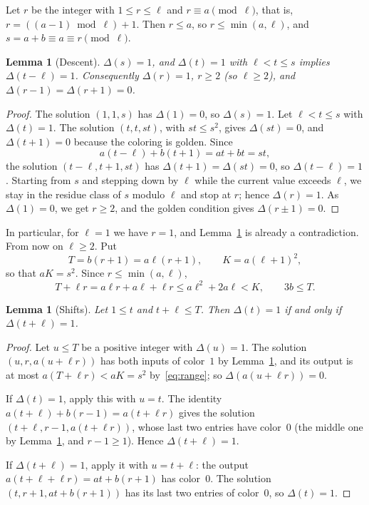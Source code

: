 \documentclass[11pt]{article}
\newtheorem{lemma}[theorem]{Lemma}
\theoremstyle{remark}
\begin{document}
Let $r$ be the integer with $1\le r\le\ell$ and $r\equiv a\pmod\ell$,
that is, $r=((a-1)\bmod \ell)+1$. Then $r\le a$, so
$r\le\min(a,\ell)$, and $s=a+b\equiv a\equiv r\pmod\ell$.

\begin{lemma}[Descent]\label{lem:descent}
$\Delta(s)=1$, and $\Delta(t)=1$ with $\ell<t\le s$ implies
$\Delta(t-\ell)=1$. Consequently $\Delta(r)=1$, $r\ge2$ (so
$\ell\ge2$), and $\Delta(r-1)=\Delta(r+1)=0$.
\end{lemma}
\begin{proof}
The solution $(1,1,s)$ has $\Delta(1)=0$, so $\Delta(s)=1$. Let
$\ell<t\le s$ with $\Delta(t)=1$. The solution $(t,t,st)$, with
$st\le s^2$, gives $\Delta(st)=0$, and $\Delta(t+1)=0$ because the
coloring is golden. Since
\[
a(t-\ell)+b(t+1)=at+bt=st,
\]
the solution $(t-\ell,t+1,st)$ has $\Delta(t+1)=\Delta(st)=0$, so
$\Delta(t-\ell)=1$. Starting from $s$ and stepping down by $\ell$ while
the current value exceeds $\ell$, we stay in the residue class of $s$
modulo $\ell$ and stop at $r$; hence $\Delta(r)=1$. As $\Delta(1)=0$, we
get $r\ge2$, and the golden condition gives $\Delta(r\pm1)=0$.
\end{proof}

In particular, for $\ell=1$ we have $r=1$, and Lemma~\ref{lem:descent}
is already a contradiction. From now on $\ell\ge2$. Put
\[
T=b(r+1)=a\ell(r+1),\qquad K=a(\ell+1)^2,
\]
so that $aK=s^2$. Since $r\le\min(a,\ell)$,
\begin{equation}\label{eq:range}
T+\ell r=a\ell r+a\ell+\ell r\le a\ell^2+2a\ell<K,\qquad 3b\le T.
\end{equation}

\begin{lemma}[Shifts]\label{lem:shift}
Let $1\le t$ and $t+\ell\le T$. Then $\Delta(t)=1$ if and only if
$\Delta(t+\ell)=1$.
\end{lemma}
\begin{proof}
Let $u\le T$ be a positive integer with $\Delta(u)=1$. The solution
$(u,r,a(u+\ell r))$ has both inputs of color~$1$ by
Lemma~\ref{lem:descent}, and its output is at most $a(T+\ell r)<aK=s^2$
by~\eqref{eq:range}; so $\Delta(a(u+\ell r))=0$.

If $\Delta(t)=1$, apply this with $u=t$. The identity
$a(t+\ell)+b(r-1)=a(t+\ell r)$ gives the solution
$(t+\ell,r-1,a(t+\ell r))$, whose last two entries have color~$0$ (the
middle one by Lemma~\ref{lem:descent}, and $r-1\ge1$). Hence
$\Delta(t+\ell)=1$.

If $\Delta(t+\ell)=1$, apply it with $u=t+\ell$: the output
$a(t+\ell+\ell r)=at+b(r+1)$ has color~$0$. The solution
$(t,r+1,at+b(r+1))$ has its last two entries of color~$0$, so
$\Delta(t)=1$.
\end{proof}
\end{document}
